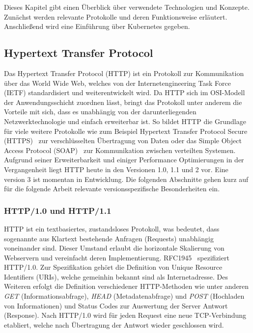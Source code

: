 Dieses Kapitel gibt einen Überblick über verwendete Technologien und Konzepte.
Zunächst werden relevante Protokolle und deren Funktionsweise erläutert.
Anschließend wird eine Einführung über Kubernetes gegeben.

\subsection{Hypertext Transfer Protocol}\label{subsec:hyper-text-transfer-protocol}

Das Hypertext Transfer Protocol (HTTP) ist ein Protokoll zur Kommunikation über das World Wide Web, welches von der Internetengineering Task Force (IETF) standardisiert und weiterentwickelt wird.
Da HTTP sich im OSI-Modell der Anwendungsschicht zuordnen lässt, bringt das Protokoll unter anderem die Vorteile mit sich, dass es unabhängig von der darunterliegenden Netzwerktechnologie und einfach erweiterbar ist.
So bildet HTTP die Grundlage für viele weitere Protokolle wie zum Beispiel Hypertext Transfer Protocol Secure (HTTPS)~\cite{rfc2818} zur verschlüsselten Übertragung von Daten oder das Simple Object Access Protocol (SOAP)~\cite{SOAP-20000508} zur Kommunikation zwischen verteilten Systemen.
Aufgrund seiner Erweiterbarkeit und einiger Performance Optimierungen in der Vergangenheit liegt HTTP heute in den Versionen 1.0, 1.1 und 2 vor.
Eine version 3 ist momentan in Entwicklung.
Die folgenden Abschnitte gehen kurz auf für die folgende Arbeit relevante versionsspezifische Besonderheiten ein.

\subsubsection{HTTP/1.0 und HTTP/1.1}
HTTP ist ein textbasiertes, zustandsloses Protokoll, was bedeutet, dass sogenannte aus Klartext bestehende Anfragen (Requests) unabhängig voneinander sind.
Dieser Umstand erlaubt die horizontale Skalierung von Webservern und vereinfacht deren Implementierung.
RFC1945~\cite{rfc1945} spezifiziert HTTP/1.0.
Zur Spezifikation gehört die Definition von Unique Resource Identifiers (URIs), welche gemeinhin bekannt sind als Internetadresse.
Des Weiteren erfolgt die Definition verschiedener HTTP-Methoden wie unter anderen \textit{GET} (Informationsabfrage), \textit{HEAD} (Metadatenabfrage) und \textit{POST} (Hochladen von Informationen) und Status Codes zur Auswertung der Server Antwort (Response).
Nach HTTP/1.0 wird für jeden Request eine neue TCP-Verbindung etabliert, welche nach Übertragung der Antwort wieder geschlossen wird.

